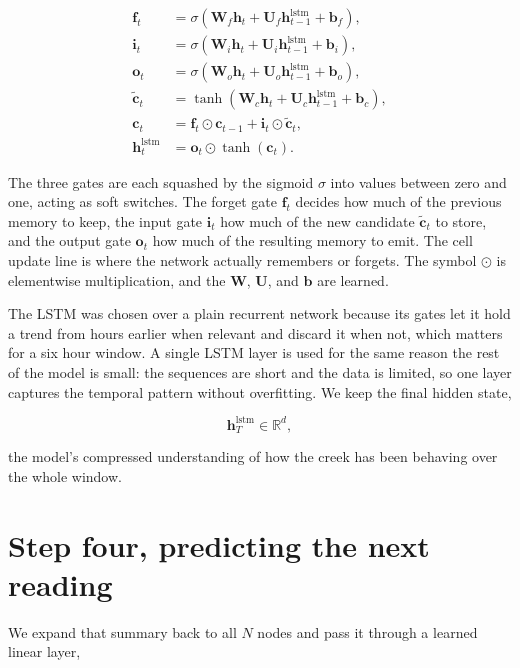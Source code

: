 \documentclass[11pt]{article}
\begin{document}
\[
\begin{aligned}
\mathbf{f}_t &= \sigma\!\left( \mathbf{W}_f \mathbf{h}_t + \mathbf{U}_f \mathbf{h}_{t-1}^{\text{lstm}} + \mathbf{b}_f \right), \\
\mathbf{i}_t &= \sigma\!\left( \mathbf{W}_i \mathbf{h}_t + \mathbf{U}_i \mathbf{h}_{t-1}^{\text{lstm}} + \mathbf{b}_i \right), \\
\mathbf{o}_t &= \sigma\!\left( \mathbf{W}_o \mathbf{h}_t + \mathbf{U}_o \mathbf{h}_{t-1}^{\text{lstm}} + \mathbf{b}_o \right), \\
\tilde{\mathbf{c}}_t &= \tanh\!\left( \mathbf{W}_c \mathbf{h}_t + \mathbf{U}_c \mathbf{h}_{t-1}^{\text{lstm}} + \mathbf{b}_c \right), \\
\mathbf{c}_t &= \mathbf{f}_t \odot \mathbf{c}_{t-1} + \mathbf{i}_t \odot \tilde{\mathbf{c}}_t, \\
\mathbf{h}_t^{\text{lstm}} &= \mathbf{o}_t \odot \tanh(\mathbf{c}_t).
\end{aligned}
\]

The three gates are each squashed by the sigmoid $\sigma$ into values between zero and one, acting as soft switches. The forget gate $\mathbf{f}_t$ decides how much of the previous memory to keep, the input gate $\mathbf{i}_t$ how much of the new candidate $\tilde{\mathbf{c}}_t$ to store, and the output gate $\mathbf{o}_t$ how much of the resulting memory to emit. The cell update line is where the network actually remembers or forgets. The symbol $\odot$ is elementwise multiplication, and the $\mathbf{W}$, $\mathbf{U}$, and $\mathbf{b}$ are learned.

The LSTM was chosen over a plain recurrent network because its gates let it hold a trend from hours earlier when relevant and discard it when not, which matters for a six hour window. A single LSTM layer is used for the same reason the rest of the model is small: the sequences are short and the data is limited, so one layer captures the temporal pattern without overfitting. We keep the final hidden state,

\[
\mathbf{h}_T^{\text{lstm}} \in \mathbb{R}^{d},
\]

the model's compressed understanding of how the creek has been behaving over the whole window.

\section*{Step four, predicting the next reading}

We expand that summary back to all $N$ nodes and pass it through a learned linear layer,
\end{document}
